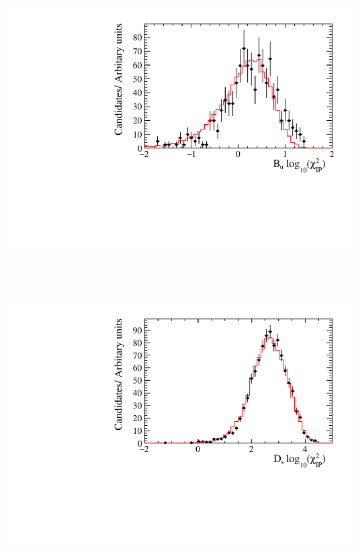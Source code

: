 \begin{figure}[!h]
\begin{subfigure}[t]{0.32\textwidth}
      \includegraphics[width=1.0\textwidth]{figs/Selection/Data_MC_Comparison_Var_1_B2DsD0_Ds2KPiPi.pdf}
      \caption{\decay{\Dsp}{\Kp\pim\pip}}
   \end{subfigure}\\
   \begin{subfigure}[t]{0.32\textwidth}
      \centering
      \includegraphics[width=1.0\textwidth]{figs/Selection/Data_MC_Comparison_Var_2_B2DsD0_Ds2KKPi.pdf}
      \caption{\decay{\Dsp}{\Kp\Km\pip}}
   \end{subfigure}
   \begin{subfigure}[t]{0.32\textwidth}
      \centering

\end{subfigure}
\end{figure}
